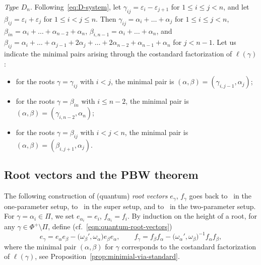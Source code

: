 \documentclass[10pt,a4paper]{amsart}
\numberwithin{equation}{section}
\begin{document}
\emph{Type $D_n$}.
Following~\eqref{eq:D-system}, let $\gamma_{ij} = \varepsilon_{i} - \varepsilon_{j + 1}$ for $1 \le i \le j <n$, and let $\beta_{ij} = \varepsilon_{i} + \varepsilon_{j}$ for $1 \le i < j \le n$. Then $\gamma_{ij} = \alpha_{i} + \dots + \alpha_{j}$ for $1 \le i \leq j < n$, $\beta_{in} = \alpha_{i} + \dots + \alpha_{n-2} + \alpha_{n}$, $\beta_{i,n -1} = \alpha_{i} + \dots + \alpha_{n}$, and $\beta_{ij} = \alpha_{i} + \dots + \alpha_{j - 1} + 2\alpha_{j} + \dots + 2\alpha_{n-2} + \alpha_{n-1} + \alpha_{n}$ for $j < n - 1$. Let us indicate the minimal pairs arising through the costandard factorization of $\ell(\gamma)$:
\begin{itemize}\itemsep=0pt
\item
for the roots $\gamma=\gamma_{ij}$ with $i<j$, the minimal pair is $(\alpha,\beta)=(\gamma_{i,j - 1},\alpha_{j})$;

\item
for the roots $\gamma=\beta_{in}$ with $i\leq n-2$, the minimal pair is $(\alpha,\beta)=(\gamma_{i,n - 2},\alpha_{n})$;

\item
for the roots $\gamma=\beta_{ij}$ with $i < j < n$, the minimal pair is $(\alpha,\beta)=(\beta_{i,j + 1},\alpha_{j})$.
\end{itemize}

\subsection{Root vectors and the PBW theorem}\label{ssec:PBW theorem and bases}

The following construction of (quantum) \textit{root vectors} $e_{\gamma}$, $f_{\gamma}$ goes back to~\cite{K1,K2,L,Ro} in the one-parameter setup, to~\cite{CHW} in the super setup, and to~\cite{BH,BKL,HW1,HW2} in the two-parameter setup. For $\gamma=\alpha_i\in \Pi$, we set
$ e_{\alpha_i}=e_i$, $f_{\alpha_i}=f_i$.
By induction on the height of a root, for any $\gamma\in \Phi^+\setminus \Pi$, define (cf.\ \eqref{eqn:quantum-root-vectors})
\begin{equation}\label{eq:root_vector}
 e_{\gamma} = e_{\alpha}e_{\beta} - \bigl(\omega_{\beta}',\omega_{\alpha}\bigr)e_{\beta}e_{\alpha} , \qquad
 f_{\gamma} = f_{\beta}f_{\alpha} - \bigl(\omega_{\alpha}',\omega_{\beta}\bigr)^{-1}f_{\alpha}f_{\beta},
\end{equation}
where the minimal pair $(\alpha,\beta)$ for $\gamma$ corresponds to the costandard factorization of $\ell(\gamma)$, see Proposition~\ref{prop:minimial-via-standard}.
\end{document}
